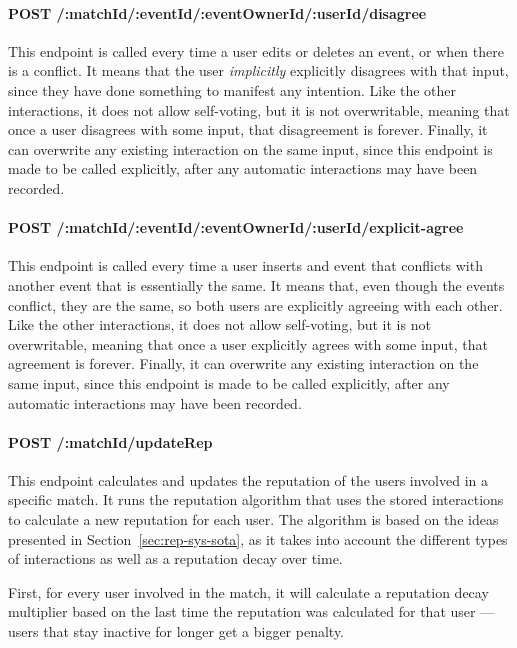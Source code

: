 \paragraph{POST /:matchId/:eventId/:eventOwnerId/:userId/disagree}

This endpoint is called every time a user edits or deletes an event, or when there is a conflict. It means that the user \textit{implicitly} explicitly disagrees with that input, since they have done something to manifest any intention. Like the other interactions, it does not allow self-voting, but it is not overwritable, meaning that once a user disagrees with some input, that disagreement is forever. Finally, it can overwrite any existing interaction on the same input, since this endpoint is made to be called explicitly, after any automatic interactions may have been recorded.

\paragraph{POST /:matchId/:eventId/:eventOwnerId/:userId/explicit-agree}

This endpoint is called every time a user inserts and event that conflicts with another event that is essentially the same. It means that, even though the events conflict, they are the same, so both users are explicitly agreeing with each other. Like the other interactions, it does not allow self-voting, but it is not overwritable, meaning that once a user explicitly agrees with some input, that agreement is forever. Finally, it can overwrite any existing interaction on the same input, since this endpoint is made to be called explicitly, after any automatic interactions may have been recorded.

\paragraph{POST /:matchId/updateRep}

This endpoint calculates and updates the reputation of the users involved in a specific match. It runs the reputation algorithm that uses the stored interactions to calculate a new reputation for each user. The algorithm is based on the ideas presented in Section~\ref{sec:rep-sys-sota}, as it takes into account the different types of interactions as well as a reputation decay over time.

First, for every user involved in the match, it will calculate a reputation decay multiplier based on the last time the reputation was calculated for that user --- users that stay inactive for longer get a bigger penalty. 

